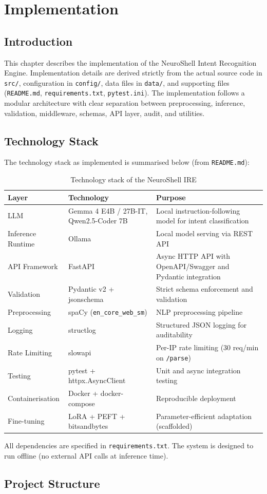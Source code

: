 ﻿\chapter{Implementation}\label{ch:implementation}

\section{Introduction}\label{sec:impl-intro}

This chapter describes the implementation of the NeuroShell Intent Recognition Engine. Implementation details are derived strictly from the actual source code in \texttt{src/}, configuration in \texttt{config/}, data files in \texttt{data/}, and supporting files (\texttt{README.md}, \texttt{requirements.txt}, \texttt{pytest.ini}). The implementation follows a modular architecture with clear separation between preprocessing, inference, validation, middleware, schemas, API layer, audit, and utilities.

\section{Technology Stack}\label{sec:impl-tech}

The technology stack as implemented is summarised below (from \texttt{README.md}):

\begin{table}[htbp]
  \centering
  \caption{Technology stack of the NeuroShell IRE}
  \label{tab:tech-stack}
  \sliittablestyle
  \begin{tabular}{lp{}p{}}
    \toprule
    \textbf{Layer} & \textbf{Technology} & \textbf{Purpose} \\
    \midrule
    LLM & Gemma 4 E4B / 27B-IT, Qwen2.5-Coder 7B & Local instruction-following model for intent classification \\
    Inference Runtime & Ollama & Local model serving via REST API \\
    API Framework & FastAPI & Async HTTP API with OpenAPI/Swagger and Pydantic integration \\
    Validation & Pydantic v2 + jsonschema & Strict schema enforcement and validation \\
    Preprocessing & spaCy (\texttt{en\_core\_web\_sm}) & NLP preprocessing pipeline \\
    Logging & structlog & Structured JSON logging for auditability \\
    Rate Limiting & slowapi & Per-IP rate limiting (30 req/min on \texttt{/parse}) \\
    Testing & pytest + httpx.AsyncClient & Unit and async integration testing \\
    Containerisation & Docker + docker-compose & Reproducible deployment \\
    Fine-tuning & LoRA + PEFT + bitsandbytes & Parameter-efficient adaptation (scaffolded) \\
    \bottomrule
  \end{tabular}
\end{table}

All dependencies are specified in \texttt{requirements.txt}. The system is designed to run offline (no external API calls at inference time).

\section{Project Structure}\label{sec:impl-structure}
